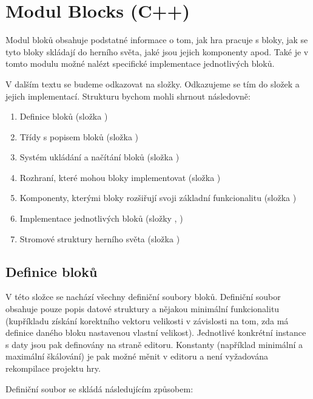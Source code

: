 
\section{Modul Blocks (C++)}

Modul bloků obsahuje podstatné informace o tom, jak hra pracuje s bloky, jak se tyto bloky skládají do herního světa, jaké jsou jejich komponenty apod. Také je v tomto modulu možné nalézt specifické implementace jednotlivých bloků.

V dalším textu se budeme odkazovat na složky. Odkazujeme se tím do složek  a jejich   implementací. Strukturu bychom mohli shrnout následovně:

\begin{enumerate}
	\item Definice bloků (složka )
	\item Třídy s popisem bloků (složka )
	\item Systém ukládání a načítání bloků (složka  )
	\item Rozhraní, které mohou bloky implementovat (složka )
	\item Komponenty, kterými bloky rozšiřují svoji základní funkcionalitu (složka )
	\item Implementace jednotlivých bloků (složky , )
	\item Stromové struktury herního světa (složka )
\end{enumerate}
 

\subsection{Definice bloků}
V této složce se nachází všechny definiční soubory bloků. Definiční soubor obsahuje pouze popis datové struktury a nějakou minimální funkcionalitu (kupříkladu získání korektního vektoru velikosti v závislosti na tom, zda má definice daného bloku nastavenou vlastní velikost). Jednotlivé konkrétní instance s daty jsou pak definovány na straně editoru. Konstanty (například minimální a maximální škálování) je pak možné měnit v editoru a není vyžadována rekompilace projektu hry. 

Definiční soubor se skládá následujícím způsobem:

